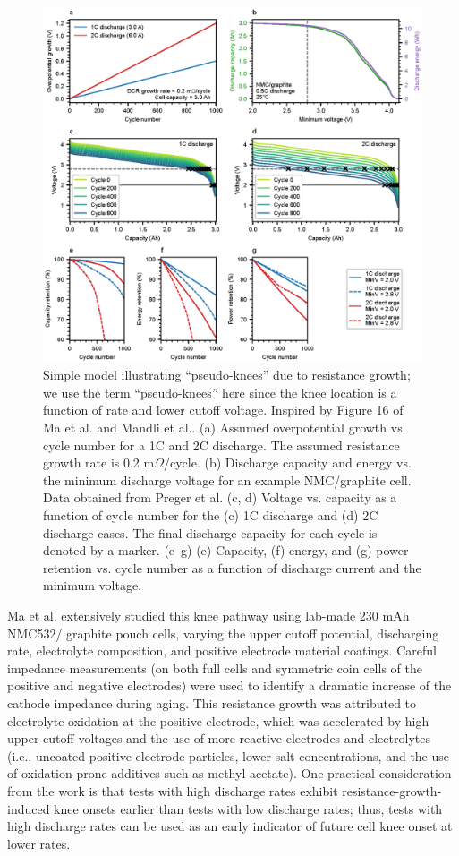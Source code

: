 \documentclass[journal=jpcl, manuscript=article, layout=onecolumn]{achemso}
\begin{document}
\begin{figure}
\centering
\includegraphics[scale = 1]{figures/dcr_growth_knee_2.eps}
\caption{Simple model illustrating ``pseudo-knees'' due to resistance growth; we use the term ``pseudo-knees'' here since the knee location is a function of rate and lower cutoff voltage. Inspired by Figure 16 of Ma et al.\cite{ma_editors_2019} and Mandli et al.\cite{mandli_analysis_2019}. (a) Assumed overpotential growth vs. cycle number for a 1C and 2C discharge. The assumed resistance growth rate is 0.2 m$\Omega$/cycle. (b) Discharge capacity and energy vs. the minimum discharge voltage for an example NMC/graphite cell. Data obtained from Preger et al.\cite{preger_degradation_2020} (c, d) Voltage vs. capacity as a function of cycle number for the (c) 1C discharge and (d) 2C discharge cases. The final discharge capacity for each cycle is denoted by a marker. (e--g) (e) Capacity, (f) energy, and (g) power retention vs. cycle number as a function of discharge current and the minimum voltage.
}
\label{fig:dcr_knee}
\end{figure}

Ma et al.\cite{ma_editors_2019} extensively studied this knee pathway using lab-made 230 mAh NMC532/ graphite pouch cells, varying the upper cutoff potential, discharging rate, electrolyte composition, and positive electrode material coatings. Careful impedance measurements (on both full cells and symmetric coin cells of the positive and negative electrodes) were used to identify a dramatic increase of the cathode impedance during aging. This resistance growth was attributed to electrolyte oxidation at the positive electrode, which was accelerated by high upper cutoff voltages and the use of more reactive electrodes and electrolytes (i.e., uncoated positive electrode particles, lower salt concentrations, and the use of oxidation-prone additives such as methyl acetate). One practical consideration from the work is that tests with high discharge rates exhibit resistance-growth-induced knee onsets earlier than tests with low discharge rates; thus, tests with high discharge rates can be used as an early indicator of future cell knee onset at lower rates.
\end{document}
